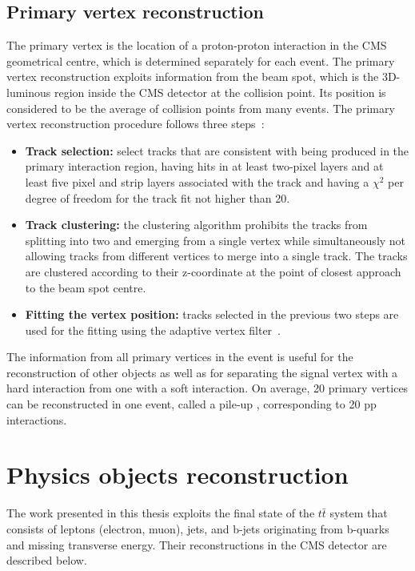\subsection{Primary vertex reconstruction}
The primary vertex is the location of a proton-proton interaction in the CMS geometrical centre, which is determined separately for each event. The primary vertex reconstruction exploits information from the beam spot, which is the 3D-luminous region inside the CMS detector at the collision point. Its position is considered to be the average of collision points from many events.
The primary vertex reconstruction procedure follows three steps~\cite{Chatrchyan:2014fea}:
\begin{itemize}
\item\textbf{Track selection:}
select tracks that are consistent with being produced in the primary interaction region, having hits in at least two-pixel layers and at least five pixel and strip layers associated with the track and having a $\chi^{2}$ per degree of freedom for the track fit not higher than 20.
\item{\textbf{Track clustering:}}
the clustering algorithm prohibits the tracks from splitting into two and emerging from a single vertex while simultaneously not allowing tracks from different vertices to merge into a single track. The tracks are clustered according to their z-coordinate at the point of closest approach to the beam spot centre.
\item{\textbf{Fitting the vertex position:}}
tracks selected in the previous two steps are used for the fitting using the adaptive vertex filter~\cite{0954-3899-34-12-N01}.
\end{itemize}

The information from all primary vertices in the event is useful for the reconstruction of other objects as well as for separating the signal vertex with a hard interaction from one with a soft interaction. On average, 20 primary vertices can be reconstructed in one event, called a pile-up , corresponding to 20 pp interactions.
\section{Physics objects reconstruction}
The work presented in this thesis exploits the final state of the $t\bar t$ system that consists of leptons (electron, muon), jets, and b-jets originating from b-quarks and missing transverse energy. Their reconstructions in the CMS detector are described below. 
